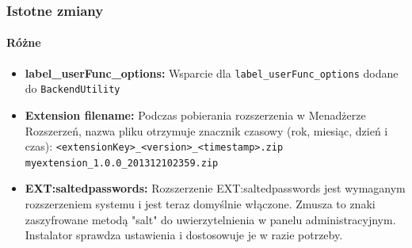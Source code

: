 \begin{frame}[fragile]
	\frametitle{Istotne zmiany}
	\framesubtitle{Różne}

	\begin{itemize}

		\item \textbf{label\_userFunc\_options:}\newline
			\small
				Wsparcie dla \texttt{label\_userFunc\_options} dodane do \texttt{BackendUtility}
			\normalsize

		\item \textbf{Extension filename:}\newline
			\small
				Podczas pobierania rozszerzenia w Menadżerze Rozszerzeń, nazwa pliku otrzymuje znacznik czasowy (rok, miesiąc, dzień i czas):\newline
				\texttt{<extensionKey>\_<version>\_<timestamp>.zip}\newline
				\texttt{myextension\_1.0.0\_201312102359.zip}
			\normalsize

		\item \textbf{EXT:saltedpasswords:}\newline
			\small
				Rozszerzenie EXT:saltedpasswords jest wymaganym rozszerzeniem systemu i jest teraz domyślnie włączone.
				Zmusza to znaki zaszyfrowane metodą "salt" do uwierzytelnienia w panelu administracyjnym. Instalator sprawdza ustawienia i dostosowuje je w razie potrzeby.
			\normalsize

	\end{itemize}
	
\end{frame}


